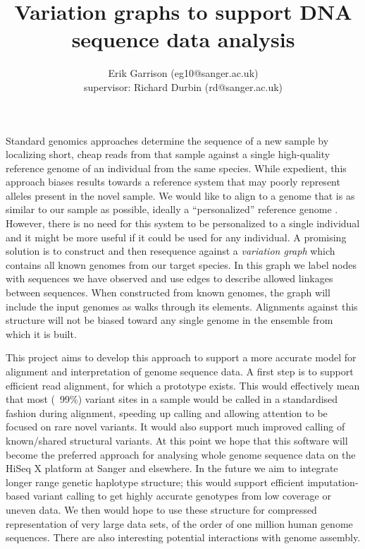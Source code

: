 \documentclass{article}
\begin{document}
\title{Variation graphs to support DNA sequence data analysis}

\author{Erik Garrison (eg10@sanger.ac.uk)\\ supervisor: Richard Durbin (rd@sanger.ac.uk)}

\maketitle

Standard genomics approaches determine the sequence of a new sample by localizing short, cheap reads from that sample against a single high-quality reference genome of an individual from the same species. While expedient, this approach biases results towards a reference system that may poorly represent alleles present in the novel sample. We would like to align to a genome that is as similar to our sample as possible, ideally a ``personalized'' reference genome \cite{Yuan_2012}. However, there is no need for this system to be personalized to a single individual and it might be more useful if it could be used for any individual. A promising solution is to construct and then resequence against a \emph{variation graph} which contains all known genomes from our target species. In this graph we label nodes with sequences we have observed and use edges to describe allowed linkages between sequences. When constructed from known genomes, the graph will include the input genomes as walks through its elements. Alignments against this structure will not be biased toward any single genome in the ensemble from which it is built.

This project aims to develop this approach to support a more accurate model for alignment and interpretation
of genome sequence data.  A first step is to support efficient read alignment, for which a prototype exists.
This would effectively mean that most (~99\%) variant sites in a sample would be called in a standardised
fashion during alignment, speeding up calling and allowing attention to be focused on rare novel variants.
It would also support much improved calling of known/shared structural variants.  At this point we hope
that this software will become the preferred approach for analysing whole genome sequence data on the
HiSeq X platform at Sanger and elsewhere.  In the future we aim to integrate longer range genetic haplotype
structure; this would support efficient imputation-based
variant calling to get highly accurate genotypes from low coverage or uneven data.  We then would hope to
use these structure for compressed representation of very large data sets, of the order of one million human
genome sequences.  There are also interesting potential interactions with genome assembly.
\end{document}
